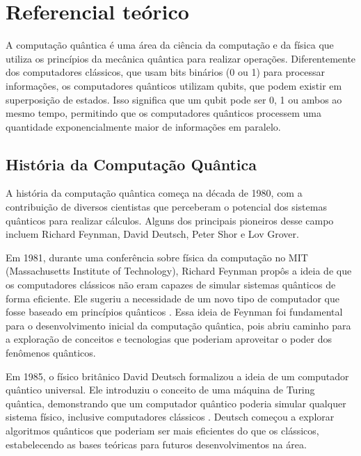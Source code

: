 \chapter{Referencial te\'orico}\label{cap:referencialTeorico}


A computação quântica é uma área da ciência da computação e da física que utiliza os princípios da mecânica quântica para realizar operações. Diferentemente dos computadores clássicos, que usam bits binários (0 ou 1) para processar informações, os computadores quânticos utilizam qubits, que podem existir em superposição de estados. Isso significa que um qubit pode ser 0, 1 ou ambos ao mesmo tempo, permitindo que os computadores quânticos processem uma quantidade exponencialmente maior de informações em paralelo.

\section{História da Computação Quântica}

A história da computação quântica começa na década de 1980, com a contribuição de diversos cientistas que perceberam o potencial dos sistemas quânticos para realizar cálculos. Alguns dos principais pioneiros desse campo incluem Richard Feynman, David Deutsch, Peter Shor e Lov Grover.

Em 1981, durante uma conferência sobre física da computação no MIT (Massachusetts Institute of Technology), Richard Feynman propôs a ideia de que os computadores clássicos não eram capazes de simular sistemas quânticos de forma eficiente. Ele sugeriu a necessidade de um novo tipo de computador que fosse baseado em princípios quânticos \cite{feynman2018simulating}. Essa ideia de Feynman foi fundamental para o desenvolvimento inicial da computação quântica, pois abriu caminho para a exploração de conceitos e tecnologias que poderiam aproveitar o poder dos fenômenos quânticos.

Em 1985, o físico britânico David Deutsch formalizou a ideia de um computador quântico universal. Ele introduziu o conceito de uma máquina de Turing quântica, demonstrando que um computador quântico poderia simular qualquer sistema físico, inclusive computadores clássicos \cite{deutsch1985quantum}. Deutsch começou a explorar algoritmos quânticos que poderiam ser mais eficientes do que os clássicos, estabelecendo as bases teóricas para futuros desenvolvimentos na área.

